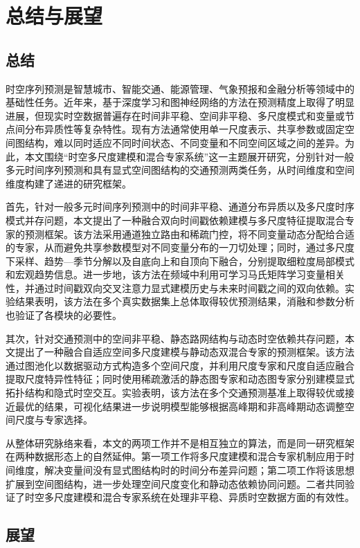 \chapter{总结与展望}

\section{总结}

时空序列预测是智慧城市、智能交通、能源管理、气象预报和金融分析等领域中的基础性任务。近年来，基于深度学习和图神经网络的方法在预测精度上取得了明显进展，但现实时空数据普遍存在时间非平稳、空间非平稳、多尺度模式和变量或节点间分布异质性等复杂特性。现有方法通常使用单一尺度表示、共享参数或固定空间图结构，难以同时适应不同时间状态、不同变量和不同空间区域之间的差异。为此，本文围绕“时空多尺度建模和混合专家系统”这一主题展开研究，分别针对一般多元时间序列预测和具有显式空间图结构的交通预测两类任务，从时间维度和空间维度构建了递进的研究框架。

首先，针对一般多元时间序列预测中的时间非平稳、通道分布异质以及多尺度时序模式并存问题，本文提出了一种融合双向时间戳依赖建模与多尺度特征提取混合专家的预测框架。该方法采用通道独立路由和稀疏门控，将不同变量动态分配给合适的专家，从而避免共享参数模型对不同变量分布的一刀切处理；同时，通过多尺度下采样、趋势—季节分解以及自底向上和自顶向下融合，分别提取细粒度局部模式和宏观趋势信息。进一步地，该方法在频域中利用可学习马氏矩阵学习变量相关性，并通过时间戳双向交叉注意力显式建模历史与未来时间戳之间的双向依赖。实验结果表明，该方法在多个真实数据集上总体取得较优预测结果，消融和参数分析也验证了各模块的必要性。

其次，针对交通预测中的空间非平稳、静态路网结构与动态时空依赖共存问题，本文提出了一种融合自适应空间多尺度建模与静动态双混合专家的预测框架。该方法通过图池化以数据驱动方式构造多个空间尺度，并利用尺度专家和尺度自适应融合提取尺度特异性特征；同时使用稀疏激活的静态图专家和动态图专家分别建模显式拓扑结构和隐式时空交互。实验表明，该方法在多个交通预测基准上取得较优或接近最优的结果，可视化结果进一步说明模型能够根据高峰期和非高峰期动态调整空间尺度与专家选择。

从整体研究脉络来看，本文的两项工作并不是相互独立的算法，而是同一研究框架在两种数据形态上的自然延伸。第一项工作将多尺度建模和混合专家机制应用于时间维度，解决变量间没有显式图结构时的时间分布差异问题；第二项工作将该思想扩展到空间图结构，进一步处理空间尺度变化和静动态依赖协同问题。二者共同验证了时空多尺度建模和混合专家系统在处理非平稳、异质时空数据方面的有效性。

\section{展望}

